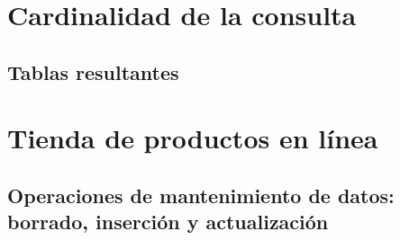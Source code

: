 \documentclass[11pt,letterpaper,spanish]{article}
\begin{document}
\section*{Cardinalidad de la consulta}


\subsection*{Tablas resultantes}
\begin{itemize}
	
	
	
	
	
	
	
	
	
	
\end{itemize}

\newpage
\section*{Tienda de productos en línea}

\begin{enumerate}[label=\alph*., leftmargin=*]
	
	
	
	
	
	
	
	
	
	
\end{enumerate}


\subsection*{Operaciones de mantenimiento de datos: borrado, inserción y actualización}


\begin{enumerate}[label=\alph*., leftmargin=*]
	
	
	
	
	
\end{enumerate}

\printbibliography
\end{document}
